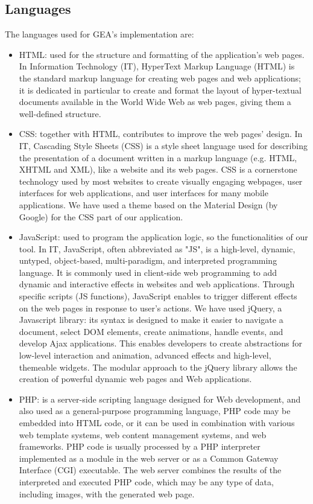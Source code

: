 \subsection{Languages}
The languages used for GEA's implementation are:
\begin{itemize}
\item HTML: used for the structure and formatting of the application's web pages. In Information Technology (IT), HyperText Markup Language (HTML) is the standard markup language for creating web pages and web applications; it is dedicated in particular to create and format the layout of hyper-textual documents available in the World Wide Web as web pages, giving them a well-defined structure.
\item CSS: together with HTML, contributes to improve the web pages' design. In IT, Cascading Style Sheets (CSS) is a style sheet language used for describing the presentation of a document written in a markup language (e.g. HTML, XHTML and XML), like a website and its web pages. CSS is a cornerstone technology used by most websites to create visually engaging webpages, user interfaces for web applications, and user interfaces for many mobile applications. We have used a theme based on the Material Design (by Google) for the CSS part of our application.
\item JavaScript: used to program the application logic, so the functionalities of our tool. In IT, JavaScript, often abbreviated as "JS", is a high-level, dynamic, untyped, object-based, multi-paradigm, and interpreted programming language. It is commonly used in client-side web programming to add dynamic and interactive effects in websites and web applications. Through specific scripts (JS functions), JavaScript enables to trigger different effects on the web pages in response to user's actions. We have used jQuery, a Javascript library: its syntax is designed to make it easier to navigate a document, select DOM elements, create animations, handle events, and develop Ajax applications. This enables developers to create abstractions for low-level interaction and animation, advanced effects and high-level, themeable widgets. The modular approach to the jQuery library allows the creation of powerful dynamic web pages and Web applications.
\item PHP:  is a server-side scripting language designed for Web development, and also used as a general-purpose programming language, PHP code may be embedded into HTML code, or it can be used in combination with various web template systems, web content management systems, and web frameworks. PHP code is usually processed by a PHP interpreter implemented as a module in the web server or as a Common Gateway Interface (CGI) executable. The web server combines the results of the interpreted and executed PHP code, which may be any type of data, including images, with the generated web page.
\end{itemize}
